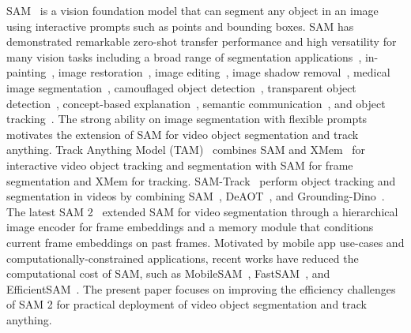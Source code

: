  SAM~\citep{kirillov2023segment} is a vision foundation model that can segment any object in an image using interactive prompts such as points and bounding boxes. SAM has demonstrated remarkable zero-shot transfer performance and high versatility for many vision tasks including a broad range of segmentation applications~\citep{chen2023semantic,cen2023sad,deng2023segment,chen2023sam}, in-painting~\citep{yu2023inpaint}, image restoration~\citep{jiang2023restore}, image editing~\citep{gao2023editanything}, image shadow removal~\citep{zhang2023deshadow}, medical image segmentation~\citep{ma2023segment}, camouflaged object detection~\citep{tang2023can}, transparent object detection~\citep{han2023segment}, concept-based explanation~\citep{sun2023explain}, semantic communication~\citep{tariq2023segment}, and object tracking~\citep{cheng2023segment,yang2023track}. The strong ability on image segmentation with flexible prompts motivates the extension of SAM for video object segmentation and track anything. Track Anything Model (TAM)~\citep{yang2023track} combines SAM and XMem~\cite{cheng2022xmem} for interactive video object tracking and segmentation with SAM for frame segmentation and XMem for tracking. SAM-Track~\citep{cheng2023segment} perform object tracking and segmentation in videos by combining SAM~\citep{kirillov2023segment}, DeAOT~\citep{yang2022decoupling}, and Grounding-Dino~\citep{liu2023grounding}. The latest SAM 2~\citep{ravi2024sam} extended SAM for video segmentation through a hierarchical image encoder for frame embeddings and a memory module that conditions current frame embeddings on past frames. Motivated by mobile app use-cases and computationally-constrained applications, recent works have reduced the computational cost of SAM, such as MobileSAM~\citep{zhang2023faster}, FastSAM~\citep{zhao2023fast}, and EfficientSAM~\citep{xiong2024efficientsam}.
The present paper focuses on improving the efficiency challenges of SAM 2 for practical deployment of video object segmentation and track anything.  